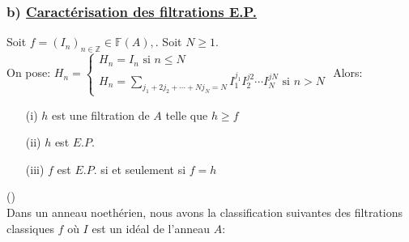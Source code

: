 \subsubsection{b) \underline{Caractérisation des filtrations E.P.}} 
\begin{maproposition}
	Soit $f=(I_{n})_{n \in \mathbb{Z}}\in \mathbb{F}(A),$. Soit $N \geqslant 1$.\\
	On pose:
	$H_{n}=\left\{ 
	\begin{array}{c}
		H_{n}=I_{n}\text{ si }n\leq N \\ 
		H_{n}=\sum\limits_{j_{1}+2j_{2}+\cdots
			+Nj_{N}=N}I_{1}^{j_{1}}I_{2}^{j2}\cdots I_{N}^{jN}\text{ si }n>N
	\end{array}
	\right. $
	Alors: 
	\begin{enumerate}
		\item[(i)] $h$ est une filtration de $A$ telle que $h \geqslant f$
		\item[(ii)] $h$ est $E.P.$
		\item[(iii)] $f$ est $E.P.$ si et seulement si $f=h$
	\end{enumerate}
\end{maproposition}


\begin{maremarque}(\cite{Di3})\\
	Dans un anneau noethérien, nous avons la classification suivantes des filtrations \\ classiques $f$ où $I$ est un idéal de l'anneau $A$:
	\begin{center}
	\end{center}
	
	
\end{maremarque}


